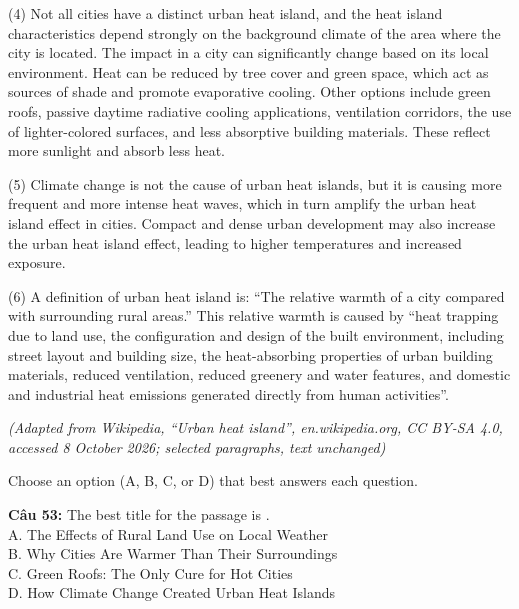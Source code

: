 \documentclass[12pt,a4paper]{article}
\begin{document}
(4) Not all cities have a distinct urban heat island, and the heat island characteristics depend strongly on the background climate of the area where the city is located. The impact in a city can significantly change based on its local environment. Heat can be reduced by tree cover and green space, which act as sources of shade and promote evaporative cooling. Other options include green roofs, passive daytime radiative cooling applications, ventilation corridors, the use of lighter-colored surfaces, and less absorptive building materials. These reflect more sunlight and absorb less heat.

(5) Climate change is not the cause of urban heat islands, but it is causing more frequent and more intense heat waves, which in turn amplify the urban heat island effect in cities. Compact and dense urban development may also increase the urban heat island effect, leading to higher temperatures and increased exposure.

(6) A definition of urban heat island is: ``The relative warmth of a city compared with surrounding rural areas.'' This relative warmth is caused by ``heat trapping due to land use, the configuration and design of the built environment, including street layout and building size, the heat-absorbing properties of urban building materials, reduced ventilation, reduced greenery and water features, and domestic and industrial heat emissions generated directly from human activities''.
\begin{flushright}\small\textit{(Adapted from Wikipedia, ``Urban heat island'', en.wikipedia.org, CC BY-SA 4.0, accessed 8 October 2026; selected paragraphs, text unchanged)}\end{flushright}

\par\nobreak


\noindent Choose an option (A, B, C, or D) that best answers each question.%

\noindent \textbf{Câu 53:} The best title for the passage is \underline{\hspace{1.2cm}}.\\
\noindent A. The Effects of Rural Land Use on Local Weather\\
\noindent B. Why Cities Are Warmer Than Their Surroundings\\
\noindent C. Green Roofs: The Only Cure for Hot Cities\\
\noindent D. How Climate Change Created Urban Heat Islands
\end{document}
